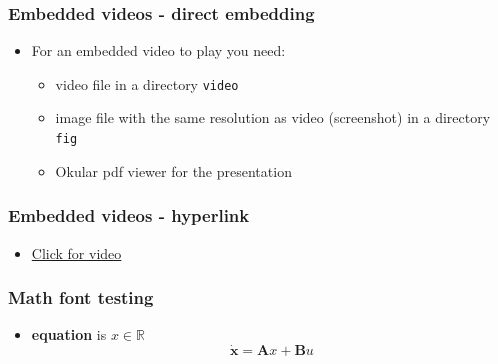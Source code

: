 \begin{frame}
   \frametitle{Embedded videos - direct embedding}
   \begin{itemize} \justifying %
      \item For an embedded video to play you need:
	 \begin{itemize}
	    \item video file in a directory \texttt{video}
	    \item image file with the same resolution as video (screenshot) in a directory \texttt{fig}
	    \item Okular pdf viewer for the presentation
	 \end{itemize}
   \end{itemize}

   \begin{center}
   \end{center}
\end{frame}

\begin{frame}
   \frametitle{Embedded videos - hyperlink}
   \begin{itemize} \justifying %
      \item \href{run:./videos/gait_sm.mp4}{Click for video}
   \end{itemize}
\end{frame}

\begin{frame}
   \frametitle{Math font testing}
   \begin{itemize} \justifying %
     \item {\bf equation} is $x \in \mathbb{R}$
      \begin{equation}
        \dot{\mathbf{x}} = \mathbf{A}x + \mathbf{B}u
      \end{equation}
   \end{itemize}
\end{frame}


